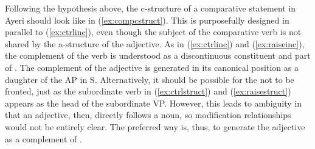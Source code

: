 \begin{figure}
\begin{morphlex}
\a{}
\xe
\end{morphlex}
\end{figure}

Following the hypothesis above, the c-structure of a comparative statement in
Ayeri should look like in (\ref{ex:compcstruct}). This is purposefully designed
in parallel to (\ref{ex:ctrlinc}), even though the subject of the comparative
verb is not shared by the a-structure of the adjective. As in
(\ref{ex:ctrlinc}) and (\ref{ex:raiseinc}), the complement of the verb is
understood as a discontinuous constituent and part of \ups{\Plink}. The
complement of the adjective is generated in its canonical position as a
daughter of the AP in S. Alternatively, it should be possible for the 
not to be fronted, just as the subordinate verb in (\ref{ex:ctrlstruct}) and
(\ref{ex:raisestruct}) appears as the head of the subordinate VP. However, this
leads to ambiguity in that an adjective, then, directly follows a noun, so
modification relationships would not be entirely clear. The preferred way is,
thus, to generate the adjective as a complement of .

